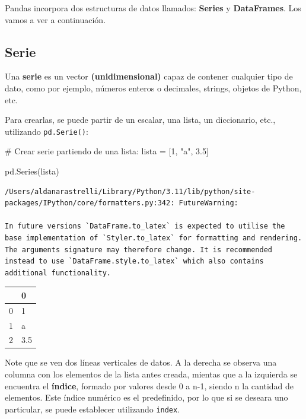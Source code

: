 \documentclass[
  letterpaper,
  DIV=11,
  numbers=noendperiod]{scrreprt}
\newenvironment{Shaded}{\begin{snugshade}}{\end{snugshade}}
\newcommand{\CommentTok}[1]{\textcolor[rgb]{0.37,0.37,0.37}{#1}}
\newcommand{\DecValTok}[1]{\textcolor[rgb]{0.68,0.00,0.00}{#1}}
\newcommand{\FloatTok}[1]{\textcolor[rgb]{0.68,0.00,0.00}{#1}}
\newcommand{\NormalTok}[1]{\textcolor[rgb]{0.00,0.23,0.31}{#1}}
\newcommand{\OperatorTok}[1]{\textcolor[rgb]{0.37,0.37,0.37}{#1}}
\newcommand{\StringTok}[1]{\textcolor[rgb]{0.13,0.47,0.30}{#1}}
\begin{document}
Pandas incorpora dos estructuras de datos llamados: \textbf{Series} y
\textbf{DataFrames}. Los vamos a ver a continuación.

\subsection{\texorpdfstring{\textbf{Serie}}{Serie}}\label{serie}

Una \textbf{serie} es un vector \textbf{(unidimensional)} capaz de
contener cualquier tipo de dato, como por ejemplo, números enteros o
decimales, strings, objetos de Python, etc.

Para crearlas, se puede partir de un escalar, una lista, un diccionario,
etc., utilizando \texttt{pd.Serie()}:

\begin{Shaded}
\begin{Highlighting}[]
\CommentTok{\# Crear serie partiendo de una lista:}
\NormalTok{lista }\OperatorTok{=}\NormalTok{ [}\DecValTok{1}\NormalTok{, }\StringTok{"a"}\NormalTok{, }\FloatTok{3.5}\NormalTok{]}

\NormalTok{pd.Series(lista)}
\end{Highlighting}
\end{Shaded}

\begin{verbatim}
/Users/aldanarastrelli/Library/Python/3.11/lib/python/site-packages/IPython/core/formatters.py:342: FutureWarning:

In future versions `DataFrame.to_latex` is expected to utilise the base implementation of `Styler.to_latex` for formatting and rendering. The arguments signature may therefore change. It is recommended instead to use `DataFrame.style.to_latex` which also contains additional functionality.
\end{verbatim}

\begin{tabular}{ll}
\toprule
{} &    0 \\
\midrule
0 &    1 \\
1 &    a \\
2 &  3.5 \\
\bottomrule
\end{tabular}

Note que se ven dos líneas verticales de datos. A la derecha se observa
una columna con los elementos de la lista antes creada, mientas que a la
izquierda se encuentra el \textbf{índice}, formado por valores desde 0 a
n-1, siendo n la cantidad de elementos. Este índice numérico es el
predefinido, por lo que si se deseara uno particular, se puede
establecer utilizando \texttt{index}.
\end{document}
